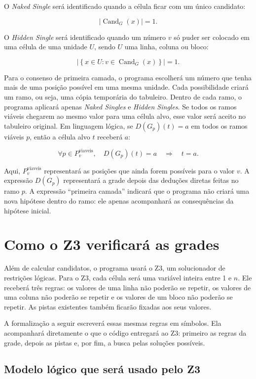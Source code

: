 O \textit{Naked Single} será identificado quando a célula ficar com um único candidato:

\[
\left|\operatorname{Cand}_G(x)\right|=1.
\]

O \textit{Hidden Single} será identificado quando um número $v$ só puder ser colocado em uma célula de uma unidade $U$, sendo $U$ uma linha, coluna ou bloco:

\[
\left|\left\{x\in U : v\in\operatorname{Cand}_G(x)\right\}\right|=1.
\]

Para o consenso de primeira camada, o programa escolherá um número que tenha mais de uma posição possível em uma mesma unidade. Cada possibilidade criará um ramo, ou seja, uma cópia temporária do tabuleiro. Dentro de cada ramo, o programa aplicará apenas \textit{Naked Singles} e \textit{Hidden Singles}. Se todos os ramos viáveis chegarem ao mesmo valor para uma célula alvo, esse valor será aceito no tabuleiro original. Em linguagem lógica, se $D(G_p)(t)=a$ em todos os ramos viáveis $p$, então a célula alvo $t$ receberá $a$:

\[
\forall p\in P_v^{\mathrm{viaveis}},\quad D(G_p)(t)=a
\quad\Longrightarrow\quad t=a.
\]

Aqui, $P_v^{\mathrm{viaveis}}$ representará as posições que ainda forem possíveis para o valor $v$. A expressão $D(G_p)$ representará a grade depois das deduções diretas feitas no ramo $p$. A expressão ``primeira camada'' indicará que o programa não criará uma nova hipótese dentro do ramo: ele apenas acompanhará as consequências da hipótese inicial.

\section{Como o Z3 verificará as grades}

Além de calcular candidatos, o programa usará o Z3, um solucionador de restrições lógicas. Para o Z3, cada célula será uma variável inteira entre 1 e $n$. Ele receberá três regras: os valores de uma linha não poderão se repetir, os valores de uma coluna não poderão se repetir e os valores de um bloco não poderão se repetir. As pistas existentes também ficarão fixadas aos seus valores.

A formalização a seguir escreverá essas mesmas regras em símbolos. Ela acompanhará diretamente o que o código entregará ao Z3: primeiro as regras da grade, depois as pistas e, por fim, a busca pelas soluções possíveis.

\subsection{Modelo lógico que será usado pelo Z3}


